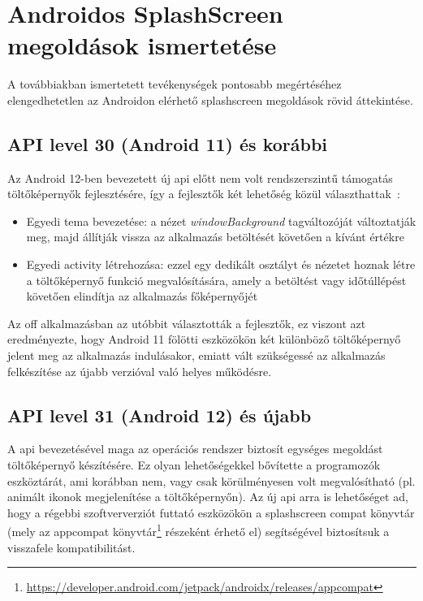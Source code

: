 \chapter{Androidos SplashScreen megoldások ismertetése}


A továbbiakban ismertetett tevékenységek pontosabb megértéséhez elengedhetetlen
az Androidon elérhető \gls{splashscreen} megoldások rövid áttekintése.

\section{API level 30 (Android 11) és korábbi}
Az Android 12-ben bevezetett új \acrshort{api} előtt nem volt rendszerszintű támogatás töltőképernyők
fejlesztésére, így a fejlesztők két lehetőség közül választhattak~\cite{splashscreenmigration}:
\begin{itemize}
 \item Egyedi \gls{tema} bevezetése: a nézet \textit{windowBackground} tagváltozóját változtatják meg,
 majd állítják vissza az alkalmazás betöltését követően a kívánt értékre
 \item Egyedi \Gls{activity} létrehozása: ezzel egy dedikált osztályt és nézetet hoznak létre
 a töltőképernyő funkció megvalósítására, amely a betöltést vagy időtúllépést követően elindítja
 az alkalmazás főképernyőjét
\end{itemize}

Az \acrlong{off} alkalmazásban az utóbbit választották a fejlesztők, ez viszont azt eredményezte,
hogy Android 11 fölötti eszközökön két különböző töltőképernyő jelent meg az alkalmazás indulásakor,
emiatt vált szükségessé az alkalmazás felkészítése az újabb verzióval való helyes működésre.

\section{API level 31 (Android 12) és újabb}
A  \acrshort{api} bevezetésével maga az operációs rendszer biztosít egységes megoldást
töltőképernyő készítésére. Ez olyan lehetőségekkel bővítette a programozók eszköztárát, ami korábban
nem, vagy csak körülményesen volt megvalósítható (pl. animált ikonok megjelenítése
a töltőképernyőn).
Az új \acrshort{api} arra is lehetőséget ad, hogy a régebbi szoftververziót futtató eszközökön a \gls{splashscreen}
compat könyvtár (mely az \gls{appcompat} könyvtár\footnote{\url{https://developer.android.com/jetpack/androidx/releases/appcompat}} részeként érhető el)
segítségével biztosítsuk a visszafele kompatibilitást.
